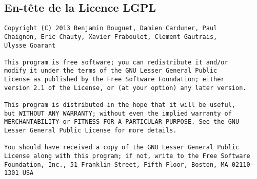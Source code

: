 \begin{appendices}
	\chapter{En-tête de la Licence LGPL}
	\label{licence}

\begin{lstlisting}
Copyright (C) 2013 Benjamin Bouguet, Damien Carduner, Paul 
Chaignon, Eric Chauty, Xavier Fraboulet, Clement Gautrais, 
Ulysse Goarant

This program is free software; you can redistribute it and/or
modify it under the terms of the GNU Lesser General Public
License as published by the Free Software Foundation; either
version 2.1 of the License, or (at your option) any later version.

This program is distributed in the hope that it will be useful,
but WITHOUT ANY WARRANTY; without even the implied warranty of
MERCHANTABILITY or FITNESS FOR A PARTICULAR PURPOSE. See the GNU
Lesser General Public License for more details.

You should have received a copy of the GNU Lesser General Public
License along with this program; if not, write to the Free Software
Foundation, Inc., 51 Franklin Street, Fifth Floor, Boston, MA 02110-1301 USA
\end{lstlisting}

\end{appendices}